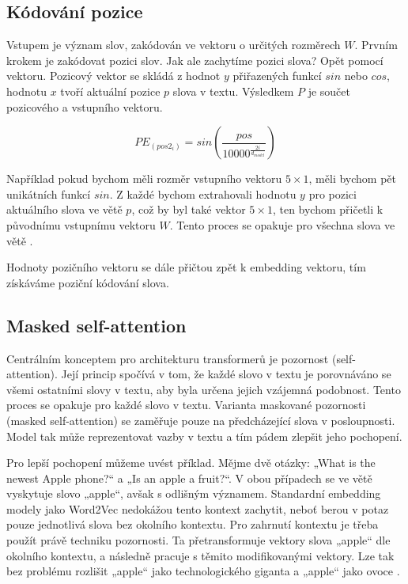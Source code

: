 \documentclass[FM,DP]{tulthesis}
\begin{document}
		\subsection{Kódování pozice}
		Vstupem je význam slov, zakódován ve vektoru o určitých rozměrech $W$. Prvním krokem je zakódovat pozici slov. Jak ale zachytíme pozici slova? Opět pomocí vektoru. Pozicový vektor se skládá z hodnot $y$ přiřazených funkcí $sin$ nebo $cos$, hodnotu $x$ tvoří aktuální pozice $p$ slova v textu. Výsledkem $P$ je součet pozicového a vstupního vektoru. 
		
		\begin{equation}
			PE_{(pos2_i)} = sin(\frac{pos}{10000^{\frac{2i}{d_{model}}}})
		\end{equation}
		
		Například pokud bychom měli rozměr vstupního vektoru $5 \times 1$, měli bychom pět unikátních funkcí $sin$. Z každé bychom extrahovali hodnotu $y$ pro pozici aktuálního slova ve větě $p$, což by byl také vektor $5 \times 1$, ten bychom přičetli k původnímu vstupnímu vektoru $W$. Tento proces se opakuje pro všechna slova ve větě \cite{rothman2021transformers}. 
		
		Hodnoty pozičního vektoru se dále přičtou zpět k embedding vektoru, tím získáváme poziční kódování slova.
		
		\subsection{Masked self-attention}
		Centrálním konceptem pro architekturu transformerů je pozornost (self-attention). Její princip spočívá v tom, že každé slovo v textu je porovnáváno se všemi ostatními slovy v textu, aby byla určena jejich vzájemná podobnost. Tento proces se opakuje pro každé slovo v textu. Varianta maskované pozornosti (masked self-attention) se zaměřuje pouze na předcházející slova v posloupnosti. Model tak může reprezentovat vazby v textu a tím pádem zlepšit jeho pochopení.
		
		Pro lepší pochopení můžeme uvést příklad. Mějme dvě otázky: „What is the newest Apple phone?“ a „Is an apple a fruit?“.  V obou případech se ve větě vyskytuje slovo „apple“, avšak s odlišným významem. Standardní embedding modely jako Word2Vec nedokážou tento kontext zachytit, neboť berou v potaz pouze jednotlivá slova bez okolního kontextu. Pro zahrnutí kontextu je třeba použít právě techniku pozornosti. Ta přetransformuje vektory slova „apple“ dle okolního kontextu, a následně pracuje s těmito modifikovanými vektory. Lze tak bez problému rozlišit „apple“ jako technologického giganta a „apple“ jako ovoce \cite{vaswani2023attention}.
		
\end{document}

